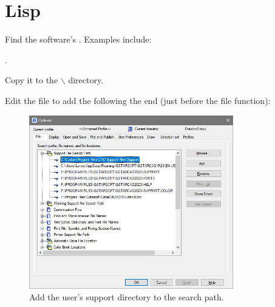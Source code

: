 \documentclass{lebook}
\newcommand{\tbs}{$\backslash$}
\newcommand*{\supportdir}{\textcode{\textit{support}}}
\newcommand*{\supportpath}{\supportdir\tbs}
\begin{document}
\section{Lisp}
\begin{numberedlist}
    \item Find the software's .  Examples include:
    \begin{bulletedlist}
    	\item {}
    	\item {}.
    \end{bulletedlist}
    \item Copy it to the \supportpath{} directory.
    \item Edit the file to add the following the end (just before the file  function):
    \begin{plainlist}
    	\item {}
		\item {}
    \end{plainlist}

\end{numberedlist}



\begin{figure}
	\centering
	\includegraphics[width=3.5in]{addsupportdirectory}
	\caption{Add the user's support directory to the search path.}
	\label{fig:addsupportdirectory}
\end{figure}


\end{document}
